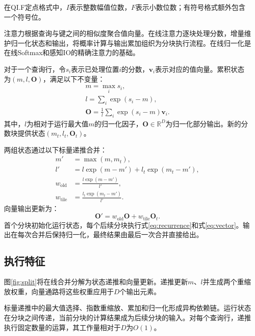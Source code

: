 \documentclass[journal]{IEEEtran}
\begin{document}
在QI.F定点格式中，$I$表示整数幅值位数，$F$表示小数位数；有符号格式额外包含一个符号位。

注意力根据查询与键之间的相似度聚合值向量。在线注意力逐块处理分数，增量维护归一化状态和输出，将概率计算与输出累加组织为分块执行流程。在线归一化是在线Softmax\cite{ref2}和感知IO的精确注意力\cite{ref3}的基础。

对于一个查询行，令$s_i$表示已处理位置$i$的分数，$\mathbf v_i$表示对应的值向量。累积状态为$(m,l,\mathbf O)$，满足以下不变量：
\begin{equation}
\begin{gathered}
 m=\max_i s_i,\\
 l=\sum_i\exp(s_i-m),\\
 \mathbf O=\frac{1}{l}\sum_i\exp(s_i-m)\mathbf v_i.
\end{gathered}
 \label{eq:invariant}
\end{equation}
其中，$l$为相对于运行最大值$m$的归一化因子，$\mathbf O\in\mathbb R^D$为归一化部分输出。新的分数块提供状态$(m_t,l_t,\mathbf O_t)$。

两组状态通过以下标量递推合并：
\begin{equation}
\begin{aligned}
 m'&=\max(m,m_t),\\
 l'&=l\exp(m-m')+l_t\exp(m_t-m'),\\
 w_{\mathrm{old}}&=\frac{l\exp(m-m')}{l'},\\
 w_{\mathrm{tile}}&=\frac{l_t\exp(m_t-m')}{l'}.
\end{aligned}\label{eq:recurrence}
\end{equation}
向量输出更新为：
\begin{equation}
 \mathbf O'=w_{\mathrm{old}}\mathbf O+w_{\mathrm{tile}}\mathbf O_t.
 \label{eq:vector}
\end{equation}
首个分块初始化运行状态，每个后续分块执行式\eqref{eq:recurrence}和式\eqref{eq:vector}。输出在每次合并后保持归一化，最终结果由最后一次合并直接给出。

\subsection{执行特征}
图\ref{fig:split}将在线合并分解为状态递推和向量更新。递推更新$m$、$l$并生成两个重缩放权重，向量通路将这些权重应用于$D$个输出元素。

标量递推中的最大值选择、指数重缩放、累加和归一化形成异构依赖链。运行状态在分块之间传递，当前分块的计算结果成为后续分块的输入。对每个查询行，递推执行固定数量的运算，其工作量相对于$D$为$O(1)$。
\end{document}
